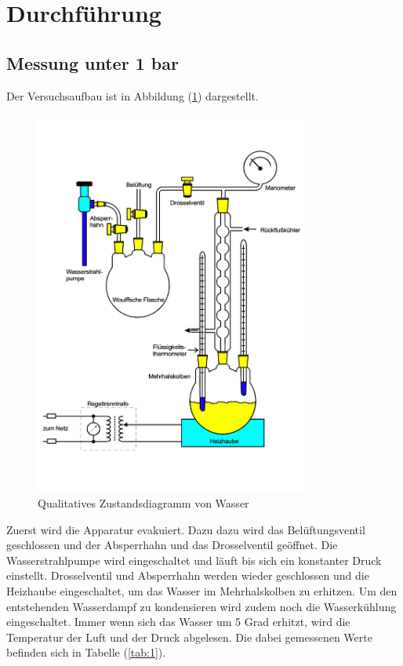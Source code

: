 \section{Durchführung}
\label{sec:dis}
\subsection{Messung unter 1 bar}
Der Versuchsaufbau ist in Abbildung (\ref{fig:aufbau1}) dargestellt.

\begin{figure}
    \centering
    \includegraphics[width=9cm]{aufbau1.pdf}
    \caption{Qualitatives Zustandsdiagramm von Wasser \cite{V203}}
    \label{fig:aufbau1}
  \end{figure}

\noindent
Zuerst wird die Apparatur evakuiert.
Dazu dazu wird das Belüftungsventil geschlossen und der Absperrhahn und das Drosselventil geöffnet. 
Die Wasserstrahlpumpe wird eingeschaltet und läuft bis sich ein konstanter Druck einstellt.
Drosselventil und Absperrhahn werden wieder geschlossen und die Heizhaube eingeschaltet, um das
Wasser im Mehrhalskolben zu erhitzen.
Um den entstehenden Wasserdampf zu kondensieren wird zudem noch die Wasserkühlung eingeschaltet.
Immer wenn sich das Wasser um 5 Grad erhitzt, wird die Temperatur der Luft und der Druck abgelesen.
Die dabei gemessenen Werte befinden sich in Tabelle (\ref{tab:1}). 



